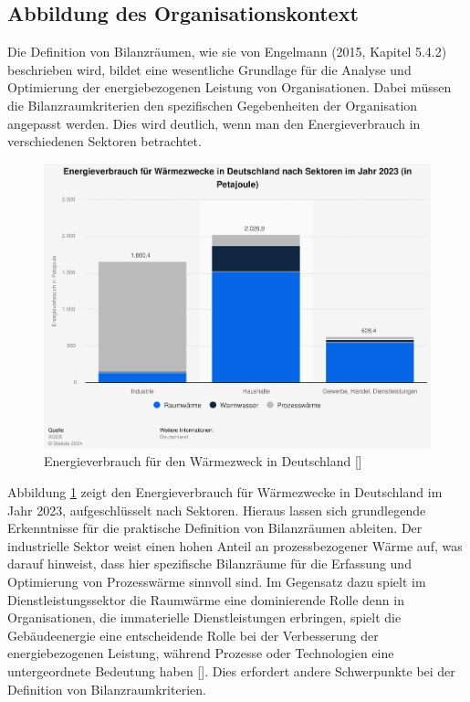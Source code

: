 
\subsection{Abbildung des Organisationskontext}
Die Definition von Bilanzräumen, wie sie von Engelmann (2015, Kapitel 5.4.2) beschrieben wird, bildet eine wesentliche Grundlage für die Analyse und Optimierung der energiebezogenen Leistung von Organisationen. 
Dabei müssen die Bilanzraumkriterien den spezifischen Gegebenheiten der Organisation angepasst werden. Dies wird deutlich, wenn man den Energieverbrauch in verschiedenen Sektoren betrachtet.

\begin{figure}[H]
    \centering
    \includegraphics[width=1\textwidth]{../../Ressourcen/Bilder/Energieverbrauch_für_Wärmezweck_DE.jpg}
    \caption{Energieverbrauch für den Wärmezweck in Deutschland [\cite{AGEB.2024}]}
    \label{fig:Energieverbrauch_Wärme_DE}
\end{figure}

Abbildung \ref{fig:Energieverbrauch_Wärme_DE} zeigt den Energieverbrauch für Wärmezwecke in Deutschland im Jahr 2023, aufgeschlüsselt nach Sektoren. Hieraus lassen sich grundlegende Erkenntnisse für die 
praktische Definition von Bilanzräumen ableiten. Der industrielle Sektor weist einen hohen Anteil an prozessbezogener Wärme auf, was darauf hinweist, dass hier spezifische Bilanzräume für die Erfassung und 
Optimierung von Prozesswärme sinnvoll sind. Im Gegensatz dazu spielt im Dienstleistungssektor die Raumwärme eine dominierende Rolle denn in Organisationen, die immaterielle Dienstleistungen 
erbringen, spielt die Gebäudeenergie eine entscheidende Rolle bei der Verbesserung der energiebezogenen Leistung, während Prozesse oder Technologien eine untergeordnete Bedeutung haben [\cite{AlbertoFichera.2020}]. 
Dies erfordert andere Schwerpunkte bei der Definition von Bilanzraumkriterien.


